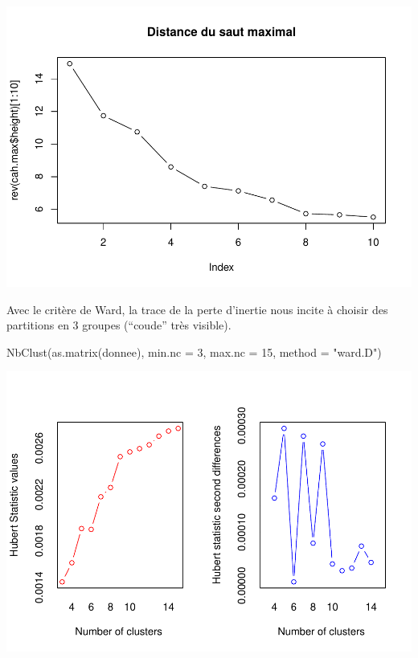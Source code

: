 \documentclass[
]{article}
\newenvironment{Shaded}{}{}
\newcommand{\AttributeTok}[1]{#1}
\newcommand{\DecValTok}[1]{#1}
\newcommand{\FunctionTok}[1]{#1}
\newcommand{\NormalTok}[1]{#1}
\newcommand{\StringTok}[1]{\textcolor[rgb]{0.00,0.50,0.50}{#1}}
\begin{document}
\includegraphics{projet_classification_files/figure-latex/unnamed-chunk-18-1.pdf}

Avec le critère de Ward, la trace de la perte d'inertie nous incite à
choisir des partitions en 3 groupes (``coude'' très visible).

\begin{Shaded}
\begin{Highlighting}[]
\FunctionTok{NbClust}\NormalTok{(}\FunctionTok{as.matrix}\NormalTok{(donnee), }\AttributeTok{min.nc =} \DecValTok{3}\NormalTok{, }\AttributeTok{max.nc =} \DecValTok{15}\NormalTok{, }\AttributeTok{method =} \StringTok{"ward.D"}\NormalTok{)}
\end{Highlighting}
\end{Shaded}

\includegraphics{projet_classification_files/figure-latex/unnamed-chunk-19-1.pdf}
\end{document}
